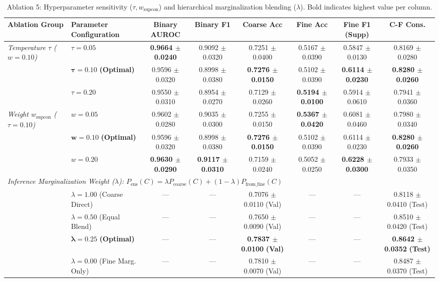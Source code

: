 \documentclass[runningheads]{llncs}
\begin{document}
\begin{table}[t]
\centering
\caption{Ablation 5: Hyperparameter sensitivity ($\tau, w_{\text{supcon}}$) and hierarchical marginalization blending ($\lambda$). Bold indicates highest value per column.}
\label{tab:ablation_hyperparameters_blending}
\begin{adjustbox}{max width=\textwidth}
\begin{tabular}{llcccccc}
\toprule
\textbf{Ablation Group} & \textbf{Parameter Configuration} & \textbf{Binary AUROC} & \textbf{Binary F1} & \textbf{Coarse Acc} & \textbf{Fine Acc} & \textbf{Fine F1 (Supp)} & \textbf{C-F Cons.} \\
\midrule
\textit{Temperature $\tau$ ($w=0.10$)} & $\tau = 0.05$ & \textbf{0.9664 $\pm$ 0.0240} & 0.9092 $\pm$ 0.0320 & 0.7251 $\pm$ 0.0400 & 0.5167 $\pm$ 0.0390 & 0.5847 $\pm$ 0.0130 & 0.8169 $\pm$ 0.0280 \\
& $\mathbf{\tau = 0.10}$ \textbf{(Optimal)} & 0.9596 $\pm$ 0.0320 & 0.8998 $\pm$ 0.0380 & \textbf{0.7276 $\pm$ 0.0150} & 0.5102 $\pm$ 0.0390 & \textbf{0.6114 $\pm$ 0.0230} & \textbf{0.8280 $\pm$ 0.0260} \\
& $\tau = 0.20$ & 0.9550 $\pm$ 0.0310 & 0.8954 $\pm$ 0.0270 & 0.7129 $\pm$ 0.0260 & \textbf{0.5194 $\pm$ 0.0100} & 0.5914 $\pm$ 0.0610 & 0.7941 $\pm$ 0.0360 \\
\midrule
\textit{Weight $w_{\text{supcon}}$ ($\tau=0.10$)} & $w = 0.05$ & 0.9602 $\pm$ 0.0280 & 0.9035 $\pm$ 0.0300 & 0.7255 $\pm$ 0.0150 & \textbf{0.5367 $\pm$ 0.0420} & 0.6081 $\pm$ 0.0460 & 0.7980 $\pm$ 0.0340 \\
& $\mathbf{w = 0.10}$ \textbf{(Optimal)} & 0.9596 $\pm$ 0.0320 & 0.8998 $\pm$ 0.0380 & \textbf{0.7276 $\pm$ 0.0150} & 0.5102 $\pm$ 0.0390 & 0.6114 $\pm$ 0.0230 & \textbf{0.8280 $\pm$ 0.0260} \\
& $w = 0.20$ & \textbf{0.9630 $\pm$ 0.0290} & \textbf{0.9117 $\pm$ 0.0310} & 0.7159 $\pm$ 0.0240 & 0.5052 $\pm$ 0.0250 & \textbf{0.6228 $\pm$ 0.0300} & 0.7933 $\pm$ 0.0350 \\
\midrule
\multicolumn{8}{l}{\textit{Inference Marginalization Weight ($\lambda$): $P_{\text{ens}}(C) = \lambda P_{\text{coarse}}(C) + (1-\lambda) P_{\text{from\_fine}}(C)$}} \\
& $\lambda = 1.00$ (Coarse Direct) & --- & --- & 0.7076 $\pm$ 0.0110 (Val) & --- & --- & 0.8118 $\pm$ 0.0410 (Test) \\
& $\lambda = 0.50$ (Equal Blend) & --- & --- & 0.7650 $\pm$ 0.0090 (Val) & --- & --- & 0.8510 $\pm$ 0.0420 (Test) \\
& $\mathbf{\lambda = 0.25}$ \textbf{(Optimal)} & --- & --- & \textbf{0.7837 $\pm$ 0.0100} \textbf{(Val)} & --- & --- & \textbf{0.8642 $\pm$ 0.0352} \textbf{(Test)} \\
& $\lambda = 0.00$ (Fine Marg. Only) & --- & --- & 0.7810 $\pm$ 0.0070 (Val) & --- & --- & 0.8487 $\pm$ 0.0370 (Test) \\
\bottomrule
\end{tabular}
\end{adjustbox}
\end{table}
\FloatBarrier
\end{document}
